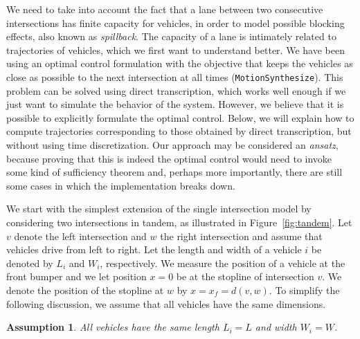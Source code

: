 \documentclass[a4paper]{article}
\theoremstyle{definition}
\theoremstyle{plain}
\newtheorem{assump}{Assumption}
\begin{document}
We need to take into account the fact that a lane between two consecutive
intersections has finite capacity for vehicles, in order to model possible
blocking effects, also known as \textit{spillback}. The capacity of a lane is intimately
related to trajectories of vehicles, which we first want to understand better.
We have been using an optimal control formulation with the objective that keeps
the vehicles as close as possible to the next intersection at all times
(\texttt{MotionSynthesize}). This problem can be solved using direct
transcription, which works well enough if we just want to simulate the behavior
of the system. However, we believe that it is possible to explicitly formulate
the optimal control. Below, we will explain how to compute trajectories
corresponding to those obtained by direct transcription, but without using time
discretization. Our approach may be considered an \textit{ansatz}, because
proving that this is indeed the optimal control would need to invoke some kind
of sufficiency theorem and, perhaps more importantly, there are still some cases
in which the implementation breaks down.

We start with the simplest extension of the single intersection model by
considering two intersections in tandem, as illustrated in
Figure~\ref{fig:tandem}. Let $v$ denote the left intersection and $w$ the right
intersection and assume that vehicles drive from left to right. Let the length
and width of a vehicle $i$ be denoted by $L_{i}$ and $W_{i}$, respectively. We
measure the position of a vehicle at the front bumper and we let position $x=0$
be at the stopline of intersection $v$. We denote the position of the stopline
at $w$ by $x=x_{f}=d(v,w)$. To simplify the following discussion, we assume that all
vehicles have the same dimensions.

\begin{assump}
  \label{assump1}
  All vehicles have the same length $L_{i} = L$ and width $W_{i} = W$.
\end{assump}
\end{document}
